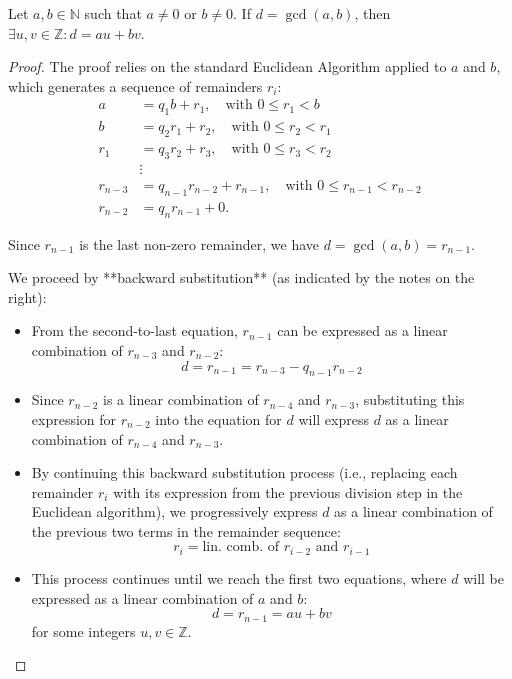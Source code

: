 \begin{proposition}
Let $a, b \in \mathbb{N}$ such that $a \neq 0$ or $b \neq 0$. If $d = \gcd(a, b)$, then $\exists u, v \in \mathbb{Z} : d = au + bv$.
\end{proposition}

\begin{proof}
    The proof relies on the standard Euclidean Algorithm applied to $a$ and $b$, which generates a sequence of remainders $r_i$:
    \begin{align*}
        a &= q_1 b + r_1, \quad \text{with } 0 \le r_1 < b \\
        b &= q_2 r_1 + r_2, \quad \text{with } 0 \le r_2 < r_1 \\
        r_1 &= q_3 r_2 + r_3, \quad \text{with } 0 \le r_3 < r_2 \\
        &\vdots \\
        r_{n-3} &= q_{n-1} r_{n-2} + r_{n-1}, \quad \text{with } 0 \le r_{n-1} < r_{n-2} \\
        r_{n-2} &= q_n r_{n-1} + 0.
    \end{align*}
    
    Since $r_{n-1}$ is the last non-zero remainder, we have $d = \gcd(a, b) = r_{n-1}$.
    
    We proceed by **backward substitution** (as indicated by the notes on the right):
    \begin{itemize}
        \item From the second-to-last equation, $r_{n-1}$ can be expressed as a linear combination of $r_{n-3}$ and $r_{n-2}$:
        $$d = r_{n-1} = r_{n-3} - q_{n-1} r_{n-2}$$
        \item Since $r_{n-2}$ is a linear combination of $r_{n-4}$ and $r_{n-3}$, substituting this expression for $r_{n-2}$ into the equation for $d$ will express $d$ as a linear combination of $r_{n-4}$ and $r_{n-3}$.
        \item By continuing this backward substitution process (i.e., replacing each remainder $r_i$ with its expression from the previous division step in the Euclidean algorithm), we progressively express $d$ as a linear combination of the previous two terms in the remainder sequence:
        $$r_{i} = \text{lin. comb. of } r_{i-2} \text{ and } r_{i-1}$$
        \item This process continues until we reach the first two equations, where $d$ will be expressed as a linear combination of $a$ and $b$:
        $$d = r_{n-1} = au + bv$$
        for some integers $u, v \in \mathbb{Z}$.
    \end{itemize}
\end{proof}

